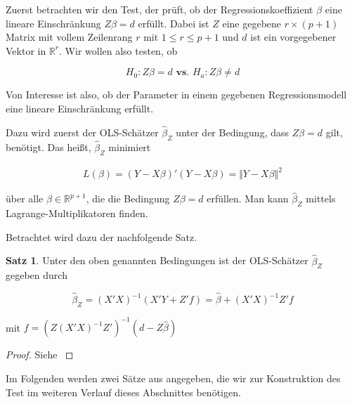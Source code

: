 \documentclass[12pt,a4paper]{article}
\theoremstyle{definition}
\theoremstyle{definition}
\newtheorem{Satz}[Definition]{Satz}
\theoremstyle{definition}
\theoremstyle{definition}
\begin{document}
Zuerst betrachten wir den Test, der prüft, ob der Regressionskoeffizient $\beta$ eine lineare Einschränkung $Z \beta = d$ erfüllt. Dabei ist $Z$ eine gegebene $r \times (p+1)$ Matrix mit vollem Zeilenrang $r$ mit $1 \leq r \leq p+1$ und $d$ ist ein vorgegebener Vektor in $\mathbb{R}^r$. Wir wollen  also testen, ob

\begin{equation}
H_{0} : Z \beta = d  \textbf{ vs. }  H_{a} : Z \beta \neq d \label{Einschränkung_Hypothese}
\end{equation}

Von Interesse ist also, ob der Parameter in einem gegebenen Regressionsmodell eine lineare Einschränkung erfüllt.

Dazu wird zuerst der OLS-Schätzer $\hat{\beta}_Z$ unter der Bedingung, dass $Z \beta = d$ gilt, benötigt. Das heißt, $\hat{\beta}_Z$ minimiert

\begin{align*}
L(\beta) = (Y-X\beta)'(Y-X\beta) = \Vert Y - X \beta \Vert^2
\end{align*}

über alle $\beta \in \mathbb{R}^{p+1}$, die die Bedingung $Z \beta = d$ erfüllen. Man kann $\hat{\beta}_Z$ mittels Lagrange-Multiplikatoren finden. 

Betrachtet wird dazu der nachfolgende Satz.

\begin{Satz}
Unter den oben genannten Bedingungen ist der OLS-Schätzer $\hat{\beta}_Z$ gegeben durch 

\begin{equation*}
\hat{\beta}_Z=(X'X)^{-1}(X'Y+Z'f)= \hat{\beta}+(X'X)^{-1}Z'f
\end{equation*}

mit $f=(Z(X'X)^{-1}Z')^{-1}(d-Z\hat{\beta})$
\end{Satz}

\begin{proof}
Siehe \cite[13]{Liu64}
\end{proof}

Im Folgenden werden zwei Sätze aus \cite{Liu64} angegeben, die wir zur Konstruktion des Test im weiteren Verlauf dieses Abschnittes benötigen.
\end{document}
